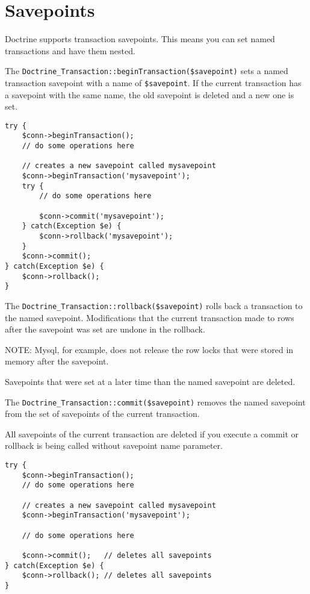 \documentclass[11pt,a4paper]{report}
\begin{document}
\section{Savepoints}
Doctrine supports transaction savepoints. This means you can set named transactions and have them nested.

The \texttt{Doctrine\_Transaction::beginTransaction(\$savepoint)} sets a named transaction savepoint with a name of \texttt{\$savepoint}. If the current transaction has a savepoint with the same name, the old savepoint is deleted and a new one is set.

\begin{verbatim}
try {
    $conn->beginTransaction();
    // do some operations here

    // creates a new savepoint called mysavepoint
    $conn->beginTransaction('mysavepoint');
    try {
        // do some operations here

        $conn->commit('mysavepoint');
    } catch(Exception $e) {
        $conn->rollback('mysavepoint');
    }
    $conn->commit();
} catch(Exception $e) {
    $conn->rollback();
}
\end{verbatim}

The \texttt{Doctrine\_Transaction::rollback(\$savepoint)} rolls back a transaction to the named savepoint. Modifications that the current transaction made to rows after the savepoint was set are undone in the rollback.

NOTE: Mysql, for example, does not release the row locks that were stored in memory after the savepoint.

Savepoints that were set at a later time than the named savepoint are deleted.

The \texttt{Doctrine\_Transaction::commit(\$savepoint)} removes the named savepoint from the set of savepoints of the current transaction.

All savepoints of the current transaction are deleted if you execute a commit or rollback is being called without savepoint name parameter.

\begin{verbatim}
try {
    $conn->beginTransaction();
    // do some operations here

    // creates a new savepoint called mysavepoint
    $conn->beginTransaction('mysavepoint');

    // do some operations here

    $conn->commit();   // deletes all savepoints
} catch(Exception $e) {
    $conn->rollback(); // deletes all savepoints
}
\end{verbatim}
\end{document}
